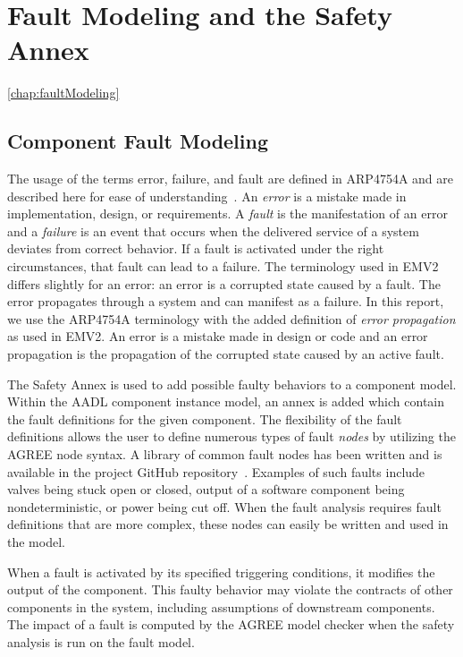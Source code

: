 \chapter{Fault Modeling and the Safety Annex}
\ref{chap:faultModeling}

\section{Component Fault Modeling}
The usage of the terms error, failure, and fault are defined in ARP4754A and are described here for ease of understanding~\cite{SAE:ARP4754A}. An \textit{error} is a mistake made in implementation, design, or requirements. A \textit{fault} is the manifestation of an error and a \textit{failure} is an event that occurs when the delivered service of a system deviates from correct behavior. If a fault is activated under the right circumstances, that fault can lead to a failure. The terminology used in EMV2 differs slightly for an error: an error is a corrupted state caused by a fault. The error propagates through a system and can  manifest as a failure. In this report, we use the ARP4754A terminology with the added definition of \textit{error propagation} as used in EMV2. An error is a mistake made in design or code and an error propagation is the propagation of the corrupted state caused by an active fault. 

The Safety Annex is used to add possible faulty behaviors to a component model. Within the AADL component instance model, an annex is added which contain the fault definitions for the given component. The flexibility of the fault definitions allows the user to define numerous types of fault \textit{nodes} by utilizing the AGREE node syntax. A library of common fault nodes has been written and is available in the project GitHub repository~\cite{SAGithub}. Examples of such faults include valves being stuck open or closed, output of a software component being nondeterministic, or power being cut off.  When the fault analysis requires fault definitions that are more complex, these nodes can easily be written and used in the model. 

When a fault is activated by its specified triggering conditions, it modifies the output of the component. This faulty behavior may violate the contracts of other components in the system, including assumptions of downstream components. The impact of a fault is computed by the AGREE model checker when the safety analysis is run on the fault model. 

